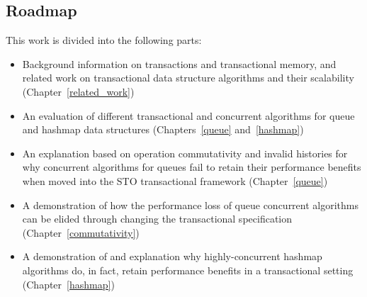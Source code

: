 \subsection{Roadmap}
This work is divided into the following parts: 
\begin{itemize}
    \item Background information on transactions and transactional memory, and related work on transactional data structure algorithms and their scalability (Chapter~\ref{related_work})
    \item An evaluation of different transactional and concurrent algorithms for queue and hashmap data structures (Chapters~\ref{queue} and~\ref{hashmap})
    \item An explanation based on operation commutativity and invalid histories for why concurrent algorithms for queues fail to retain their performance benefits when moved into the STO transactional framework (Chapter~\ref{queue})
    \item A demonstration of how the performance loss of queue concurrent algorithms can be elided through changing the transactional specification (Chapter~\ref{commutativity})
    \item A demonstration of and explanation why highly-concurrent hashmap algorithms do, in fact, retain performance benefits in a transactional setting (Chapter~\ref{hashmap})
\end{itemize}
